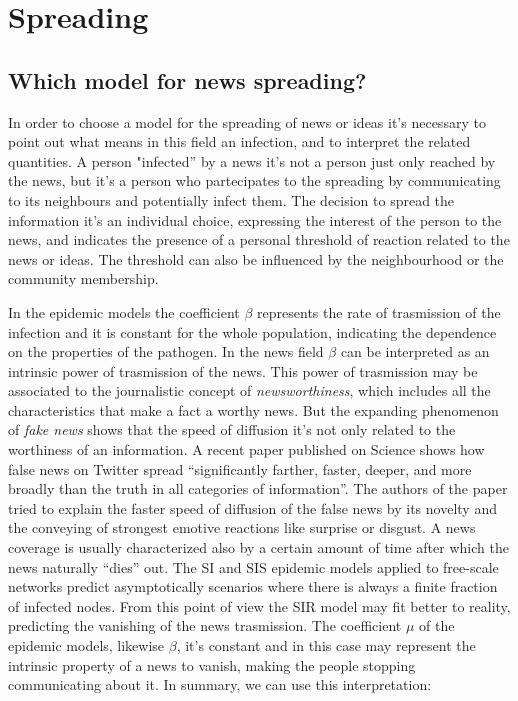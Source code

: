 \chapter{Spreading} %
\label{cha:spreading}

\section{Which model for news spreading?}

In order to choose a model for the spreading of news or ideas it's necessary to point out
what means in this field an infection, and to interpret the related quantities.
A person "infected'' by a news it's not a person just only reached by the news, but it's a person
who partecipates to the spreading by communicating to its neighbours and potentially infect them.
The decision to spread the information it's an individual choice, expressing the interest
of the person to the news, and indicates the presence of a personal threshold of reaction related to the news or ideas.
The threshold can also be influenced by the neighbourhood or the community membership.


In the epidemic models the coefficient $\beta$ represents the rate of trasmission of the infection and it is constant for the whole population, indicating the dependence on the properties of the pathogen.
In the news field $\beta$ can be interpreted as an intrinsic power of trasmission of the news.
This power of trasmission may be associated to the journalistic concept of \textit{newsworthiness},
which includes all the characteristics that make a fact a worthy news.
But the expanding phenomenon of \textit{fake news} shows that the speed of diffusion it's not only related to
the worthiness of an information. A recent paper published on Science \cite{Vosoughi_2018} shows how false news on Twitter spread 
``significantly farther, faster, deeper, and more broadly than the truth in all categories of information''.
The authors of the paper tried to explain the faster speed of diffusion of the false news by its novelty and the conveying
of strongest emotive reactions like surprise or disgust.
A news coverage is usually characterized also by a certain amount of time after which the news naturally ``dies'' out.
The SI and SIS epidemic models applied to free-scale networks predict asymptotically scenarios where there is always a finite 
fraction of infected nodes. From this point of view the SIR model may fit better to reality, predicting the vanishing of the news trasmission.
The coefficient $\mu$ of the epidemic models, likewise $\beta$, it's constant and in this case may represent the intrinsic property of a news to vanish, making the people stopping communicating about it. In summary, we can use this interpretation:

